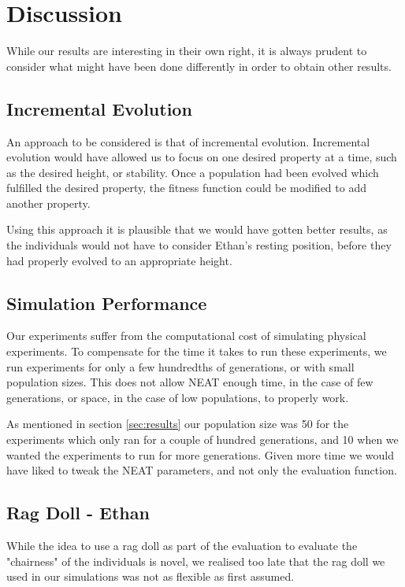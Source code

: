 \section{Discussion}
While our results are interesting in their own right, it is always prudent to 
consider what might have been done differently in order to obtain other results.

\subsection{Incremental Evolution}
An approach to be considered is that of incremental evolution. Incremental 
evolution would have allowed us to focus on one desired property at a time,
such as the desired height, or stability. Once a population had been evolved
which fulfilled the desired property, the fitness function could be modified to
add another property. 

Using this approach it is plausible that we would have gotten better results, 
as the individuals would not have to consider Ethan's resting position, before 
they had properly evolved to an appropriate height.
\subsection{Simulation Performance}
Our experiments suffer from the computational cost of simulating physical
experiments. To compensate for the time it takes to run these experiments, we
run experiments for only a few hundredths of generations, or with small
population sizes. This does not allow NEAT enough time, in the case of few 
generations, or space, in the case of low populations, to properly work.

As mentioned in section \ref{sec:results} our population size was 50 for the 
experiments which only ran for a couple of hundred generations, and 10 when we 
wanted the experiments to run for more generations.
Given more time we would have liked to tweak the NEAT parameters, and not only 
the evaluation function.

\subsection{Rag Doll - Ethan}
While the idea to use a rag doll as part of the evaluation to evaluate the 
"chairness" of the individuals is novel, we realised too late that the rag doll 
we used in our simulations was not as flexible as first assumed.

